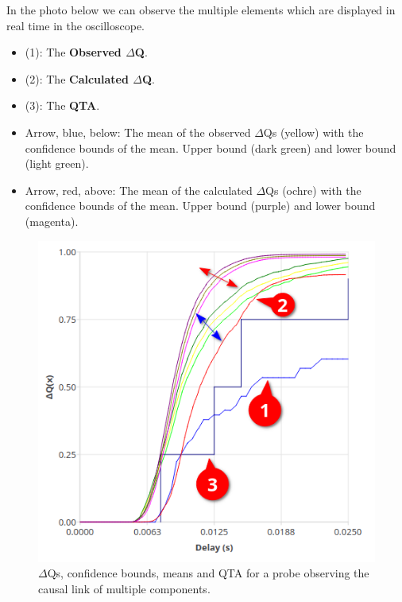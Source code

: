     In the photo below we can observe the multiple elements which are displayed in real time in the oscilloscope.
    \begin{itemize}
        \item (1): The \textbf{Observed $\Delta$Q}.
        \item (2): The \textbf{Calculated $\Delta$Q}.
        \item (3): The \textbf{QTA}.
        \item Arrow, blue, below: The mean of the observed $\Delta$Qs (yellow) with the confidence bounds of the mean. Upper bound (dark green) and lower bound (light green).
        \item Arrow, red, above: The mean of the calculated $\Delta$Qs (ochre) with the confidence bounds of the mean. Upper bound (purple) and lower bound (magenta).
    \end{itemize}
     \begin{figure}[H]
        \begin{center}
            \includegraphics[scale = 0.8]{img/overload_2/qta_triggerd2.png}
        \end{center}
         \caption{$\Delta$Qs, confidence bounds, means and QTA for a probe observing the causal link of multiple components.}
    \end{figure}
        

